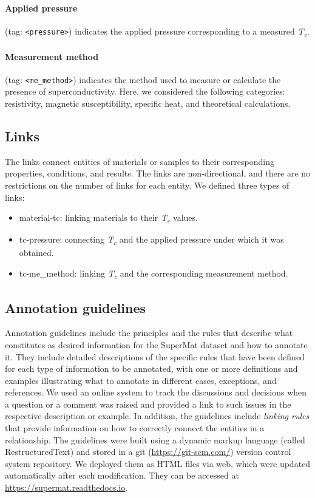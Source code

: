 \paragraph{Applied pressure} (tag: \texttt{<pressure>}) indicates the applied pressure corresponding to a measured \textit{T\textsubscript{c}}. 

\paragraph{Measurement method} (tag: \texttt{<me\_method>}) indicates the method used to measure or calculate the presence of superconductivity. Here, we considered the following categories: resistivity, magnetic susceptibility, specific heat, and theoretical calculations. 


\subsection{Links}
The links connect entities of materials or samples to their corresponding properties, conditions, and results. 
The links are non-directional, and there are no restrictions on the number of links for each entity. 
We defined three types of links:

\begin{itemize}
    \item material-tc: linking materials to their \textit{T\textsubscript{c}} values.
    \item tc-pressure: connecting \textit{T\textsubscript{c}} and the applied pressure under which it was obtained.
    \item tc-me\_method: linking \textit{T\textsubscript{c}} and the corresponding measurement method. 
\end{itemize}


\subsection{Annotation guidelines}
\label{subsec:annotation-guidelines}
Annotation guidelines include the principles and the rules that describe what constitutes as desired information for the SuperMat dataset and how to annotate it. They include detailed descriptions of the specific rules that have been defined for each type of information to be annotated, with one or more definitions and examples illustrating what to annotate in different cases, exceptions, and references. We used an online system to track the discussions and decisions when a question or a comment was raised and provided a link to such issues in the respective description or example. 
In addition, the guidelines include \textit{linking rules} that provide information on how to correctly connect the entities in a relationship. 
The guidelines were built using a dynamic markup language (called RestructuredText) and stored in a git (\url{https://git-scm.com/}) version control system repository. We deployed them as HTML files via web, which were updated automatically after each modification. They can be accessed at \url{https://supermat.readthedocs.io}.

